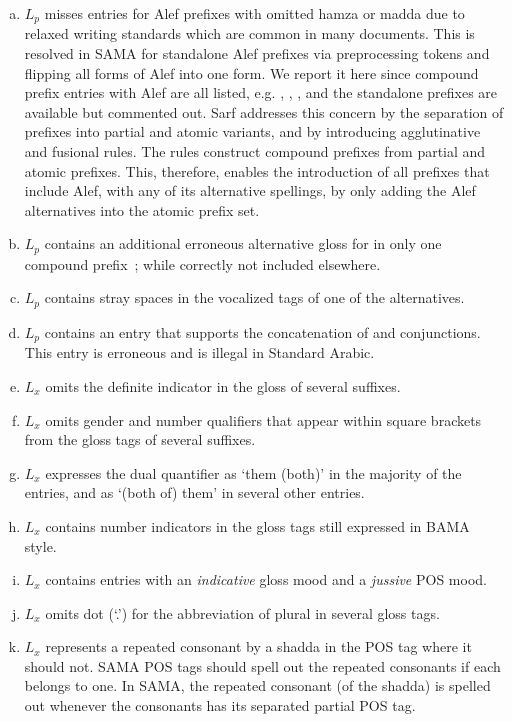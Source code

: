 \begin{enumerate}[(a)]
\item \label{inc:relaxed}
  $L_p$ misses entries for Alef prefixes with omitted hamza or madda due to relaxed
    writing standards which are common in many documents. 
    This is resolved in SAMA for standalone Alef prefixes via preprocessing tokens and flipping all forms of Alef into one form. 
    We report it here since compound prefix entries with Alef are all listed, 
    e.g. , 
    , , and 
    the standalone prefixes are available but commented out.
Sarf addresses this concern by the separation of prefixes into partial and atomic variants, and by 
introducing agglutinative and fusional rules. The rules construct compound prefixes from partial and atomic prefixes. 
This, therefore, enables the introduction of all prefixes that include Alef, with any of its alternative spellings, 
by only adding the Alef alternatives into the atomic prefix set. 
\item \label{inc:by} $L_p$ contains an additional erroneous alternative gloss for  in only one compound prefix~; while correctly not included elsewhere.
\item \label{inc:fa} $L_p$  contains stray spaces in the vocalized tags of one of the  alternatives.
\item \label{inc:wafa} $L_p$  contains an entry that supports the concatenation of  and  conjunctions. 
    This entry is erroneous and is illegal in Standard Arabic.
\item \label{inc:def} $L_x$  omits the definite indicator in the gloss of several suffixes.
\item \label{inc:num_gender} 
    $L_x$  omits gender and number qualifiers that appear within square brackets 
    from the gloss tags of several suffixes.
\item \label{inc:both:sama} 
    $L_x$  
    expresses the dual quantifier as `them (both)' in the majority of the entries, and 
    as `(both of) them' in several other entries.
\item \label{inc:num_gender_differences} 
    $L_x$  
    contains number indicators in the gloss tags still expressed in BAMA style.%
\item \label{inc:jus} 
    $L_x$  contains entries with an 
    {\em indicative} gloss mood and a {\em jussive} POS mood.
\item \label{inc:dot:SAMA} 
    $L_x$  omits dot (`.') for the abbreviation of plural in several gloss tags.
\item \label{inc:pos:SAMA} 
    $L_x$  
    represents a repeated consonant by a shadda in the POS tag where it should not. 
    SAMA POS tags should spell out the repeated consonants if each belongs to one.  
    In SAMA, the repeated consonant (of the shadda) is spelled out
    whenever the consonants has its separated partial POS tag. 
\end{enumerate}


